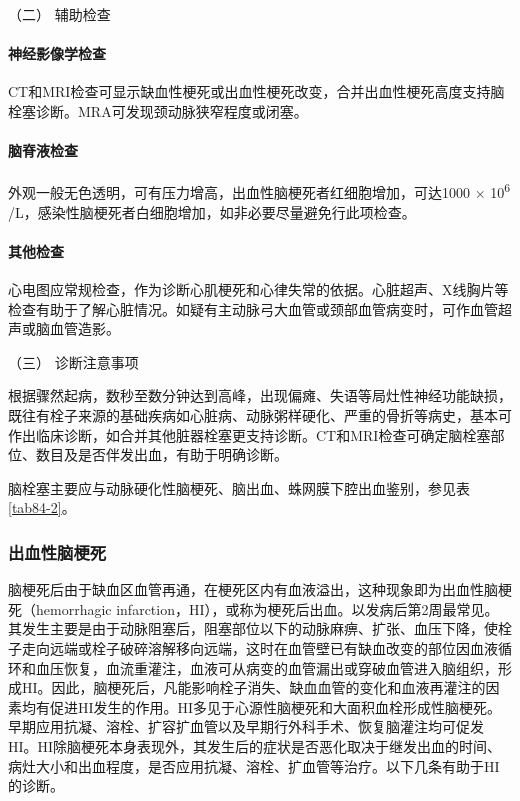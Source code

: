 \hypertarget{text00242.htmlux5cux23CHP8-1-2-2-2-2}{}
（二） 辅助检查

\paragraph{神经影像学检查}

CT和MRI检查可显示缺血性梗死或出血性梗死改变，合并出血性梗死高度支持脑栓塞诊断。MRA可发现颈动脉狭窄程度或闭塞。

\paragraph{脑脊液检查}

外观一般无色透明，可有压力增高，出血性脑梗死者红细胞增加，可达1000 ×
10\textsuperscript{6}
/L，感染性脑梗死者白细胞增加，如非必要尽量避免行此项检查。

\paragraph{其他检查}

心电图应常规检查，作为诊断心肌梗死和心律失常的依据。心脏超声、X线胸片等检查有助于了解心脏情况。如疑有主动脉弓大血管或颈部血管病变时，可作血管超声或脑血管造影。

\hypertarget{text00242.htmlux5cux23CHP8-1-2-2-2-3}{}
（三） 诊断注意事项

根据骤然起病，数秒至数分钟达到高峰，出现偏瘫、失语等局灶性神经功能缺损，既往有栓子来源的基础疾病如心脏病、动脉粥样硬化、严重的骨折等病史，基本可作出临床诊断，如合并其他脏器栓塞更支持诊断。CT和MRI检查可确定脑栓塞部位、数目及是否伴发出血，有助于明确诊断。

脑栓塞主要应与动脉硬化性脑梗死、脑出血、蛛网膜下腔出血鉴别，参见表\ref{tab84-2}。

\subsubsection{出血性脑梗死}

脑梗死后由于缺血区血管再通，在梗死区内有血液溢出，这种现象即为出血性脑梗死（hemorrhagic
infarction，HI），或称为梗死后出血。以发病后第2周最常见。其发生主要是由于动脉阻塞后，阻塞部位以下的动脉麻痹、扩张、血压下降，使栓子走向远端或栓子破碎溶解移向远端，这时在血管壁已有缺血改变的部位因血液循环和血压恢复，血流重灌注，血液可从病变的血管漏出或穿破血管进入脑组织，形成HI。因此，脑梗死后，凡能影响栓子消失、缺血血管的变化和血液再灌注的因素均有促进HI发生的作用。HI多见于心源性脑梗死和大面积血栓形成性脑梗死。早期应用抗凝、溶栓、扩容扩血管以及早期行外科手术、恢复脑灌注均可促发HI。HI除脑梗死本身表现外，其发生后的症状是否恶化取决于继发出血的时间、病灶大小和出血程度，是否应用抗凝、溶栓、扩血管等治疗。以下几条有助于HI的诊断。

